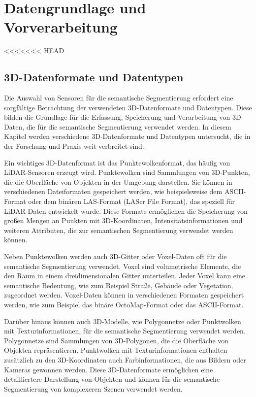 \chapter{Datengrundlage und Vorverarbeitung}
<<<<<<< HEAD

\section{3D-Datenformate und Datentypen}
Die Auswahl von Sensoren für die semantische Segmentierung erfordert eine
sorgfältige Betrachtung der verwendeten 3D-Datenformate und Datentypen. Diese
bilden die Grundlage für die Erfassung, Speicherung und Verarbeitung von
3D-Daten, die für die semantische Segmentierung verwendet werden. In diesem
Kapitel werden verschiedene 3D-Datenformate und Datentypen untersucht, die in
der Forschung und Praxis weit verbreitet sind.

Ein wichtiges 3D-Datenformat ist das Punktewolkenformat, das häufig von
LiDAR-Sensoren erzeugt wird. Punktewolken sind Sammlungen von 3D-Punkten, die
die Oberfläche von Objekten in der Umgebung darstellen. Sie können in
verschiedenen Dateiformaten gespeichert werden, wie beispielsweise dem
ASCII-Format oder dem binären LAS-Format (LASer File Format), das speziell für
LiDAR-Daten entwickelt wurde. Diese Formate ermöglichen die Speicherung von
großen Mengen an Punkten mit 3D-Koordinaten, Intensitätsinformationen und
weiteren Attributen, die zur semantischen Segmentierung verwendet werden
können.

Neben Punktewolken werden auch 3D-Gitter oder Voxel-Daten oft für die
semantische Segmentierung verwendet. Voxel sind volumetrische Elemente, die den
Raum in einem dreidimensionalen Gitter unterteilen. Jeder Voxel kann eine
semantische Bedeutung, wie zum Beispiel Straße, Gebäude oder Vegetation,
zugeordnet werden. Voxel-Daten können in verschiedenen Formaten gespeichert
werden, wie zum Beispiel das binäre OctoMap-Format oder das ASCII-Format.

Darüber hinaus können auch 3D-Modelle, wie Polygonnetze oder Punktwolken mit
Texturinformationen, für die semantische Segmentierung verwendet werden.
Polygonnetze sind Sammlungen von 3D-Polygonen, die die Oberfläche von Objekten
repräsentieren. Punktwolken mit Texturinformationen enthalten zusätzlich zu den
3D-Koordinaten auch Farbinformationen, die aus Bildern oder Kameras gewonnen
werden. Diese 3D-Datenformate ermöglichen eine detailliertere Darstellung von
Objekten und können für die semantische Segmentierung von komplexeren Szenen
verwendet werden.


